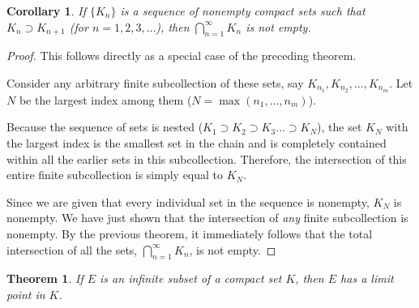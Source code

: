 \documentclass{article}
\theoremstyle{mythm}
\newtheorem{theorem}{Theorem}[section]
\newtheorem{corollary}{Corollary}[theorem]
\begin{document}
\begin{corollary}
If $\{K_n\}$ is a sequence of nonempty compact sets such that $K_n \supset K_{n+1}$ (for $n = 1, 2, 3, \dots$), then $\bigcap_{n=1}^\infty K_n$ is not empty.
\end{corollary}

\begin{proof}
This follows directly as a special case of the preceding theorem. 

Consider any arbitrary finite subcollection of these sets, say $K_{n_1}, K_{n_2}, \dots, K_{n_m}$. Let $N$ be the largest index among them ($N = \max(n_1, \dots, n_m)$). 

Because the sequence of sets is nested ($K_1 \supset K_2 \supset K_3 \dots \supset K_N$), the set $K_N$ with the largest index is the smallest set in the chain and is completely contained within all the earlier sets in this subcollection. 
Therefore, the intersection of this entire finite subcollection is simply equal to $K_N$. 

Since we are given that every individual set in the sequence is nonempty, $K_N$ is nonempty. 
We have just shown that the intersection of \textit{any} finite subcollection is nonempty. By the previous theorem, it immediately follows that the total intersection of all the sets, $\bigcap_{n=1}^\infty K_n$, is not empty.
\end{proof}
\begin{theorem}
If $E$ is an infinite subset of a compact set $K$, then $E$ has a limit point in $K$.
\end{theorem}
\end{document}
